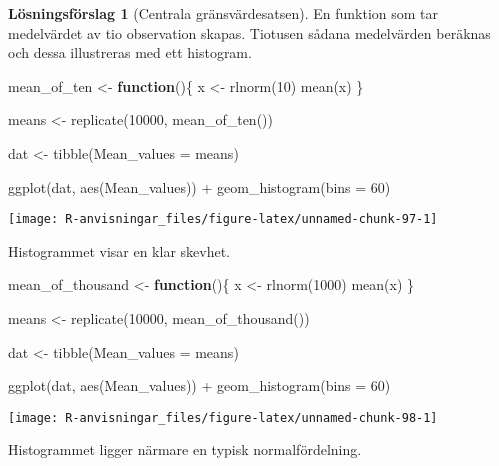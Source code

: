 \documentclass[
]{book}
\newenvironment{Shaded}{\begin{snugshade}}{\end{snugshade}}
\newcommand{\AttributeTok}[1]{\textcolor[rgb]{0.77,0.63,0.00}{#1}}
\newcommand{\ControlFlowTok}[1]{\textcolor[rgb]{0.13,0.29,0.53}{\textbf{#1}}}
\newcommand{\DecValTok}[1]{\textcolor[rgb]{0.00,0.00,0.81}{#1}}
\newcommand{\FunctionTok}[1]{\textcolor[rgb]{0.00,0.00,0.00}{#1}}
\newcommand{\NormalTok}[1]{#1}
\newcommand{\OtherTok}[1]{\textcolor[rgb]{0.56,0.35,0.01}{#1}}
\newcommand{\SpecialCharTok}[1]{\textcolor[rgb]{0.00,0.00,0.00}{#1}}
\theoremstyle{definition}
\theoremstyle{definition}
\theoremstyle{definition}
\theoremstyle{definition}
\newtheorem{hypothesis}{Lösningsförslag}[chapter]
\theoremstyle{remark}
\begin{document}
\begin{hypothesis}[Centrala gränsvärdesatsen]
En funktion som tar medelvärdet av tio observation skapas. Tiotusen sådana medelvärden beräknas och dessa illustreras med ett histogram.

\begin{Shaded}
\begin{Highlighting}[]
\NormalTok{mean\_of\_ten }\OtherTok{\textless{}{-}} \ControlFlowTok{function}\NormalTok{()\{}
\NormalTok{  x }\OtherTok{\textless{}{-}} \FunctionTok{rlnorm}\NormalTok{(}\DecValTok{10}\NormalTok{)}
  \FunctionTok{mean}\NormalTok{(x)}
\NormalTok{\}}

\NormalTok{means }\OtherTok{\textless{}{-}} \FunctionTok{replicate}\NormalTok{(}\DecValTok{10000}\NormalTok{, }\FunctionTok{mean\_of\_ten}\NormalTok{())}

\NormalTok{dat }\OtherTok{\textless{}{-}} \FunctionTok{tibble}\NormalTok{(}\AttributeTok{Mean\_values =}\NormalTok{ means)}

\FunctionTok{ggplot}\NormalTok{(dat, }\FunctionTok{aes}\NormalTok{(Mean\_values)) }\SpecialCharTok{+}
  \FunctionTok{geom\_histogram}\NormalTok{(}\AttributeTok{bins =} \DecValTok{60}\NormalTok{)}
\end{Highlighting}
\end{Shaded}

\begin{center}\texttt{[image: R-anvisningar\_files/figure-latex/unnamed-chunk-97-1]} \end{center}

Histogrammet visar en klar skevhet.

\begin{Shaded}
\begin{Highlighting}[]
\NormalTok{mean\_of\_thousand }\OtherTok{\textless{}{-}} \ControlFlowTok{function}\NormalTok{()\{}
\NormalTok{  x }\OtherTok{\textless{}{-}} \FunctionTok{rlnorm}\NormalTok{(}\DecValTok{1000}\NormalTok{)}
  \FunctionTok{mean}\NormalTok{(x)}
\NormalTok{\}}

\NormalTok{means }\OtherTok{\textless{}{-}} \FunctionTok{replicate}\NormalTok{(}\DecValTok{10000}\NormalTok{, }\FunctionTok{mean\_of\_thousand}\NormalTok{())}

\NormalTok{dat }\OtherTok{\textless{}{-}} \FunctionTok{tibble}\NormalTok{(}\AttributeTok{Mean\_values =}\NormalTok{ means)}

\FunctionTok{ggplot}\NormalTok{(dat, }\FunctionTok{aes}\NormalTok{(Mean\_values)) }\SpecialCharTok{+}
  \FunctionTok{geom\_histogram}\NormalTok{(}\AttributeTok{bins =} \DecValTok{60}\NormalTok{)}
\end{Highlighting}
\end{Shaded}

\begin{center}\texttt{[image: R-anvisningar\_files/figure-latex/unnamed-chunk-98-1]} \end{center}

Histogrammet ligger närmare en typisk normalfördelning.
\end{hypothesis}
\end{document}
